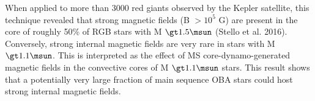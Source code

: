 When applied to more than 3000 red giants observed by the Kepler satellite, this technique revealed that
strong magnetic fields (B $\gt 10^5$ G) are present in the core of roughly 50\% of RGB stars with M $\gt 1.5\msun$ (Stello et al. 2016).
Conversely, strong internal magnetic fields are very rare in stars with M $\gt 1.1\msun$. This is interpreted as the
effect of MS core-dynamo-generated magnetic fields in the convective cores of M $\gt 1.1\msun$ stars.
This result shows that a potentially very large fraction of main sequence OBA stars could host strong internal magnetic fields.




